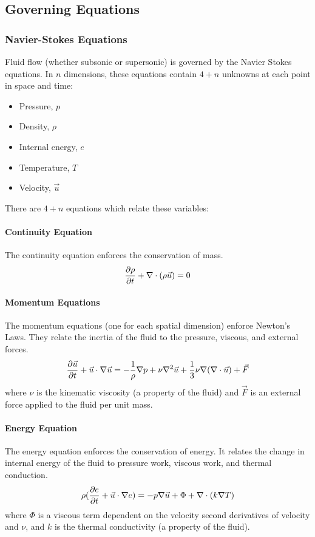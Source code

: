 \documentclass[paper=a4, fontsize=11pt]{scrartcl}
\numberwithin{equation}{section}        %
\numberwithin{figure}{section}          %
\numberwithin{table}{section}               %
\begin{document}
\subsection{Governing Equations}
\subsubsection{Navier-Stokes Equations}
Fluid flow (whether subsonic or supersonic) is governed by the Navier Stokes equations. In $n$ dimensions, these equations contain $4 + n$ unknowns at each point in space and time:
\begin{itemize}
    \item Pressure, $p$
    \item Density, $\rho$
    \item Internal energy, $e$
    \item Temperature, $T$
    \item Velocity, $\vec{u}$
\end{itemize}

There are $4 + n$ equations which relate these variables:

\paragraph{Continuity Equation}
The continuity equation enforces the conservation of mass.
\begin{equation}
    \label{eqn:ns_continuity}
    \pdv{\rho}{t} + \nabla \cdot (\rho \vec{u}) = 0
\end{equation}

\paragraph{Momentum Equations}
The momentum equations (one for each spatial dimension) enforce Newton's Laws. They relate the inertia of the fluid to the pressure, viscous, and external forces.
\begin{equation}
    \label{eqn:ns_momentum}
    \pdv{\vec{u}}{t} + \vec{u} \cdot \nabla \vec{u} = - \frac{1}{\rho} \nabla p + \nu \nabla^2 \vec{u} + \frac{1}{3} \nu \nabla (\nabla \cdot \vec{u}) + \vec{F}
\end{equation}
where $\nu$ is the kinematic viscosity (a property of the fluid) and $\vec{F}$ is an external force applied to the fluid per unit mass.

\paragraph{Energy Equation}
The energy equation enforces the conservation of energy. It relates the change in internal energy of the fluid to pressure work, viscous work, and thermal conduction.
\begin{equation}
    \label{eqn:ns_energy}
    \rho(\pdv{e}{t} + \vec{u} \cdot \nabla e) = - p \nabla \vec{u} + \Phi + \nabla \cdot (k \nabla T)
\end{equation}
where $\Phi$ is a viscous term dependent on the velocity second derivatives of velocity and $\nu$, and $k$ is the thermal conductivity (a property of the fluid).
\end{document}
